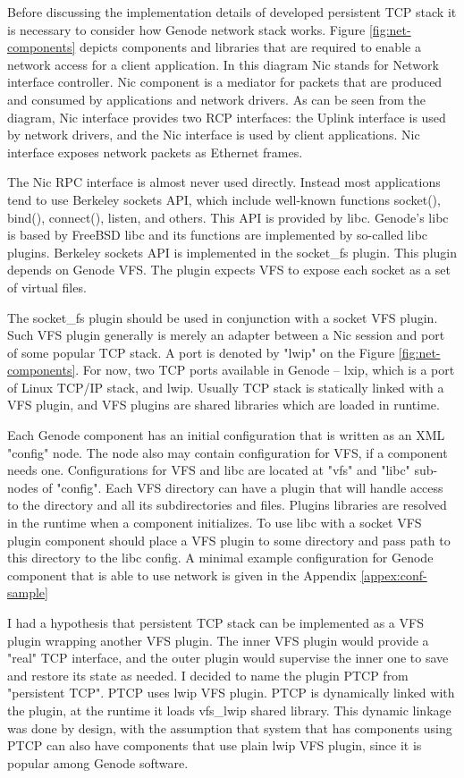 Before discussing the implementation details of developed persistent TCP stack
it is necessary to consider how Genode network stack works. Figure
\ref{fig:net-components} depicts components and libraries that are required to
enable a network access for a client application. In this diagram Nic stands
for Network interface controller. Nic component is a mediator for packets that
are produced and consumed by applications and network drivers. As can be seen
from the diagram, Nic interface provides two RCP interfaces: the Uplink
interface is used by network drivers, and the Nic interface is used by client
applications. Nic interface exposes network packets as Ethernet frames.

The Nic RPC interface is almost never used directly. Instead most applications
tend to use Berkeley sockets API, which include well-known functions socket(),
bind(), connect(), listen, and others. This API is provided by libc. Genode's
libc is based by FreeBSD libc and its functions are implemented by so-called
libc plugins. Berkeley sockets API is implemented in the socket\_fs plugin.
This plugin depends on Genode VFS. The plugin expects VFS to expose each socket
as a set of virtual files.

The socket\_fs plugin should be used in conjunction with a socket VFS plugin. 
Such VFS plugin generally is merely an adapter between a Nic session and port
of some popular TCP stack. A port is denoted by "lwip" on the Figure
\ref{fig:net-components}. For now, two TCP ports available in Genode -- lxip,
which is a port of Linux TCP/IP stack, and lwip. Usually TCP stack is
statically linked with a VFS plugin, and VFS plugins are shared libraries which
are loaded in runtime.

Each Genode component has an initial configuration that is written as an XML
"config" node. The node also may contain configuration for VFS, if a component
needs one. Configurations for VFS and libc are located at "vfs" and "libc"
sub-nodes of "config". Each VFS directory can have a plugin that will handle
access to the directory and all its subdirectories and files. Plugins libraries
are resolved in the runtime when a component initializes. To use libc with a
socket VFS plugin component should place a VFS plugin to some directory and
pass path to this directory to the libc config. A minimal example configuration
for Genode component that is able to use network is given in the Appendix
\ref{appex:conf-sample}

I had a hypothesis that persistent TCP stack can be implemented as a VFS plugin
wrapping another VFS plugin. The inner VFS plugin would provide a "real" 
TCP interface, and the outer plugin would supervise the inner one to save and
restore its state as needed. I decided to name the plugin PTCP from "persistent
TCP". PTCP uses lwip VFS plugin. PTCP is dynamically linked with the plugin, at
the runtime it loads vfs\_lwip shared library. This dynamic linkage was done by
design, with the assumption that system that has components using PTCP can also
have components that use plain lwip VFS plugin, since it is popular among
Genode software.

